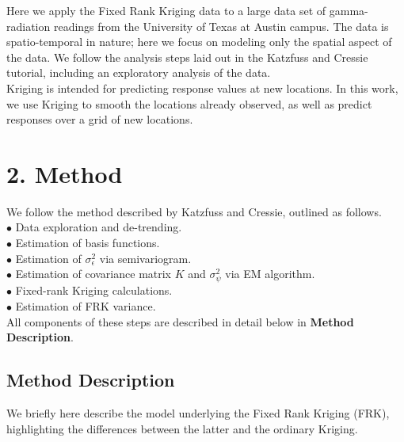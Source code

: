 \documentclass[11pt]{article}
\begin{document}
Here we apply the Fixed Rank Kriging data to a large data set of gamma-radiation readings from the University of Texas at Austin campus.  The data is spatio-temporal in nature; here we focus on modeling only the spatial aspect of the data.  We follow the analysis steps laid out in the Katzfuss and Cressie tutorial, including an exploratory analysis of the data. \\

Kriging is intended for predicting response values at new locations.  In this work, we use Kriging to smooth the locations already observed, as well as predict responses over a grid of new locations. \\

\newpage
\section{2. Method}

We follow the method described by Katzfuss and Cressie, outlined as follows. \\
$\bullet$ Data exploration and de-trending. \\
$\bullet$ Estimation of basis functions. \\
$\bullet$ Estimation of $\sigma^2_\epsilon$ via semivariogram. \\
$\bullet$ Estimation of covariance matrix $K$ and $\sigma^2_\psi$ via EM algorithm. \\
$\bullet$ Fixed-rank Kriging calculations. \\
$\bullet$ Estimation of FRK variance. \\

All components of these steps are described in detail below in \textbf{Method Description}. \\


\subsection{Method Description}

We briefly here describe the model underlying the Fixed Rank Kriging (FRK), highlighting the differences between the latter and the ordinary Kriging. \\
\end{document}
